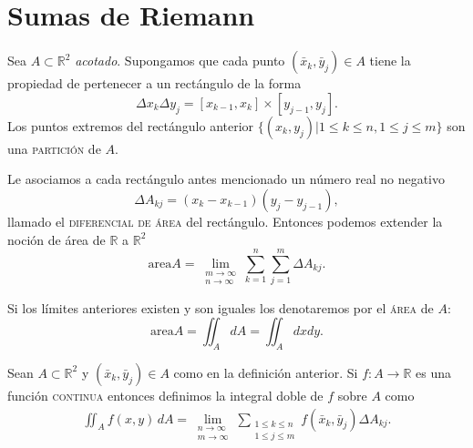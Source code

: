 \documentclass[mid,fleqn,draft,twoside]{notasdeclase}
\renewcommand{\t}{\times}
\newcommand{\R}{\mathbb{R}}
\begin{document}
\section{Sumas de Riemann}

\begin{defi}[área]
	Sea $A\subset\R^2$ \emph{acotado}. Supongamos que cada punto $(\bar x_k,\bar y_j)\in A$ tiene la propiedad de pertenecer a un rectángulo de la forma
	\[ \Delta x_k\Delta y_j = [x_{k-1},x_k]\t[y_{j-1},y_j]. \]
	Los puntos extremos del rectángulo anterior $\{(x_k,y_j)| 1\leq k\leq n, 1\leq j\leq m \}$ son una 
	\textup{\textsf{\textsc{partición}}}
	de $A$.
	
	Le asociamos a cada rectángulo antes mencionado un número real no negativo
	\[ \Delta A_{kj} = (x_k-x_{k-1})(y_j-y_{j-1}), \]
	llamado el 
	\textup{\textsf{\textsc{diferencial de área}}}
	del rectángulo. Entonces podemos extender la noción de área de $\R$ a $\R^2$
	\[ \textrm{area} A = \lim\limits_{\substack{m\to\infty \\ n\to\infty}} \sum_{k=1}^{n}\sum_{j=1}^{m}\Delta A_{kj}.  \]
	
	Si los límites anteriores existen y son iguales los denotaremos por el \textsc{área} de $A$:
	\[ \textrm{area} A = \iint_A dA = \iint_A dxdy. \]
\end{defi}
\begin{defi}
	Sean $A\subset\R^2$ y $(\bar x_k,\bar y_j)\in A$ como en la definición anterior. Si $f:A\to\R$ es una función \textsc{continua} entonces definimos la integral doble de $f$ sobre $A$ como
	\begin{align}\label{defiint}
		\iint_A f(x,y)\,dA = \lim_{\substack{n\to\infty \\ m\to\infty}} \sum_{\substack{1\leq k\leq n \\ 1\leq j\leq m}} f(\bar x_k,\bar y_j)\Delta A_{kj}.
	\end{align}
\end{defi}
\end{document}
